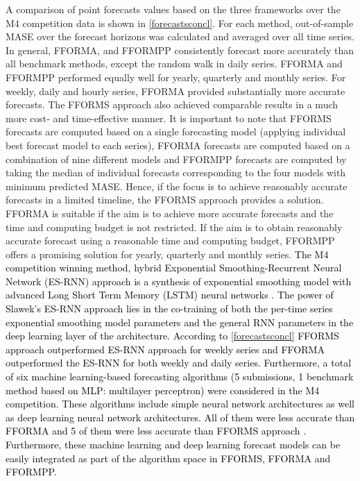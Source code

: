 \documentclass{monashthesis}
\begin{document}
A comparison of point forecasts values based on the three frameworks over the M4 competition data is shown in \autoref{forecastsconcl}. For each method, out-of-sample MASE over the forecast horizons was calculated and averaged over all time series. In general, FFORMA, and FFORMPP consistently forecast more accurately than all benchmark methods, except the random walk in daily series. FFORMA and FFORMPP performed equally well for yearly, quarterly and monthly series. For weekly, daily and hourly series, FFORMA provided substantially more accurate forecasts. The FFORMS approach also achieved comparable results in a much more cost- and time-effective manner. It is important to note that FFORMS forecasts are computed based on a single forecasting model (applying individual best forecast model to each series), FFORMA forecasts are computed based on a combination of nine different models and FFORMPP forecasts are computed by taking the median of individual forecasts corresponding to the four models with minimum predicted MASE. Hence, if the focus is to achieve reasonably accurate forecasts in a limited timeline, the FFORMS approach provides a solution. FFORMA is suitable if the aim is to achieve more accurate forecasts and the time and computing budget is not restricted. If the aim is to obtain reasonably accurate forecast using a reasonable time and computing budget, FFORMPP offers a promising solution for yearly, quarterly and monthly series. \textcolor{black}{The M4 competition winning method, hybrid Exponential Smoothing-Recurrent Neural Network (ES-RNN) approach is a synthesis of exponential smoothing model with advanced Long Short Term Memory (LSTM) neural networks} \autocite{smyl2019hybrid}\textcolor{black}{. The power of Slawek's ES-RNN approach lies in the co-training of both the per-time series exponential smoothing model parameters and the general RNN parameters in the deep learning layer of the architecture. According to} \autoref{forecastsconcl} \textcolor{black}{FFORMS approach outperformed ES-RNN approach for weekly series and FFORMA outperformed the ES-RNN for both weekly and daily series.} \textcolor{black}{Furthermore, a total of six  machine learning-based forecasting algorithms (5 submissions, 1 benchmark method based on MLP: multilayer perceptron) were considered in the M4 competition. These algorithms include simple neural network architectures as well as deep learning neural network architectures. All of them were less accurate than FFORMA and 5 of them were less accurate than FFORMS approach} \autocite{makridakis2019m4} \textcolor{black}{. Furthermore, these machine learning and deep learning forecast models can be easily integrated as part of the algorithm space in FFORMS, FFORMA and FFORMPP.}
\end{document}
